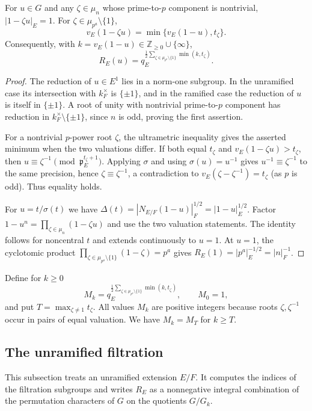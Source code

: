 \begin{lemma}\label{W:lem:valuations}
For $u\in G$ and any $\zeta\in\mu_n$ whose prime-to-$p$ component is nontrivial, $|1-\zeta u|_E=1$. For $\zeta\in\mu_{p^a}\setminus\{1\}$,
\[
 v_E(1-\zeta u)=\min\{v_E(1-u),t_\zeta\}.
\]
Consequently, with $k=v_E(1-u)\in\mathbb Z_{\geq0}\cup\{\infty\}$,
\begin{equation}\label{W:eq:radial}
 R_E(u)=q_E^{\frac12\sum_{\zeta\in\mu_{p^a}\setminus\{1\}}\min(k,t_\zeta)}.
\end{equation}
\end{lemma}
\begin{proof}
The reduction of $u\in E^1$ lies in a norm-one subgroup. In the unramified case its intersection with $k_F^\times$ is $\{\pm1\}$, and in the ramified case the reduction of $u$ is itself in $\{\pm1\}$. A root of unity with nontrivial prime-to-$p$ component has reduction in $k_F^\times\setminus\{\pm1\}$, since $n$ is odd, proving the first assertion.

For a nontrivial $p$-power root $\zeta$, the ultrametric inequality gives the asserted minimum when the two valuations differ. If both equal $t_\zeta$ and $v_E(1-\zeta u)>t_\zeta$, then $u\equiv\zeta^{-1}\pmod{\mathfrak p_E^{t_\zeta+1}}$. Applying $\sigma$ and using $\sigma(u)=u^{-1}$ gives $u^{-1}\equiv\zeta^{-1}$ to the same precision, hence $\zeta\equiv\zeta^{-1}$, a contradiction to $v_E(\zeta-\zeta^{-1})=t_\zeta$ (as $p$ is odd). Thus equality holds.

For $u=t/\sigma(t)$ we have
$\Delta(t)=|N_{E/F}(1-u)|_F^{1/2}=|1-u|_E^{1/2}$.
Factor $1-u^n=\prod_{\zeta\in\mu_n}(1-\zeta u)$ and use the two valuation statements. The identity follows for noncentral $t$ and extends continuously to $u=1$. At $u=1$, the cyclotomic product $\prod_{\zeta\in\mu_{p^a}\setminus\{1\}}(1-\zeta)=p^a$ gives $R_E(1)=|p^a|_E^{-1/2}=|n|_F^{-1}$.
\end{proof}

Define for $k\geq0$
\[
 M_k=q_E^{\frac12\sum_{\zeta\in\mu_{p^a}\setminus\{1\}}\min(k,t_\zeta)},\qquad M_0=1,
\]
and put $T=\max_{\zeta\ne1}t_\zeta$. All values $M_k$ are positive integers because roots $\zeta,\zeta^{-1}$ occur in pairs of equal valuation. We have $M_k=M_T$ for $k\geq T$.

\subsection{The unramified filtration}
This subsection treats an unramified extension $E/F$. It computes the indices of the filtration subgroups and writes $R_E$ as a nonnegative integral combination of the permutation characters of $G$ on the quotients $G/G_k$.

